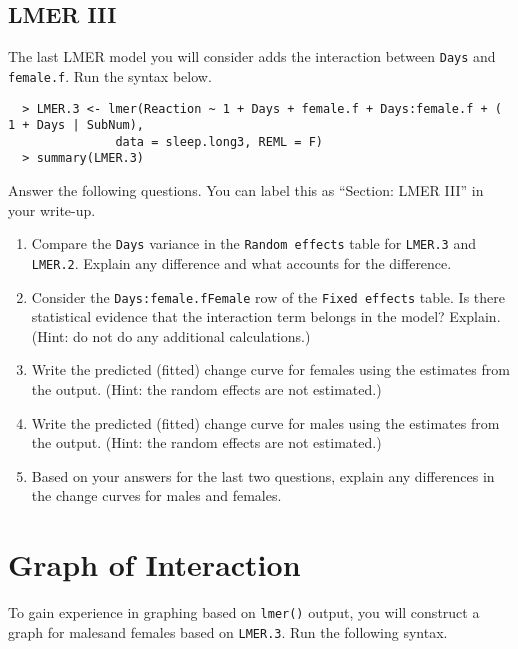 \documentclass[]{article}
\begin{document}
%
%

\subsection*{LMER III}

\noindent The last LMER model you will consider adds the interaction between \texttt{Days} and
\texttt{female.f}. Run the syntax below.

\begin{verbatim}
  > LMER.3 <- lmer(Reaction ~ 1 + Days + female.f + Days:female.f + ( 1 + Days | SubNum),
               data = sleep.long3, REML = F)
  > summary(LMER.3)
\end{verbatim}

\noindent Answer the following questions. You can label this as ``Section: LMER III'' in your write-up.

\begin{enumerate}[resume]
\item Compare the \texttt{Days} variance in the \texttt{Random effects} table for \texttt{LMER.3} and \texttt{LMER.2}. Explain any difference and what accounts for the difference.
\item Consider the \texttt{Days:female.fFemale} row of the \texttt{Fixed effects} table. Is there statistical evidence that the interaction term belongs in the model? Explain. (Hint: do not do any additional calculations.)
\item Write the predicted (fitted) change curve for females using the estimates from the output. (Hint: the random effects are not estimated.)
\item Write the predicted (fitted) change curve for males using the estimates from the output. (Hint: the random effects are not estimated.)
\item Based on your answers for the last two questions, explain any differences in the change curves for males and females.
\end{enumerate}

%
%

\section*{Graph of Interaction}

\noindent To gain experience in graphing based on \texttt{lmer()} output, you will construct a graph for malesand females based on \texttt{LMER.3}. Run the following syntax.
\end{document}
